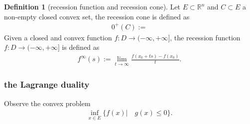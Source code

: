 \documentclass[a4paper,11pt,fleqn, draft]{book}
\newtheorem{lemma}[theorem]{Lemma}
\theoremstyle{definition}
\newtheorem{definition}{Definition}[section]
\theoremstyle{remark}
\newtheorem*{remark}{Remark}
\DeclareMathOperator*{\interior}{int}
\begin{document}
\begin{definition}[recession function and recession cone]
Let $E \subset \mathbb{R}^n$ and $C \subset E$ a non-empty closed convex set, the recession cone is defined as
	\begin{align*}
		0^+(C):= 
	\end{align*}
	Given a closed and convex function $f: D \rightarrow (-\infty, +\infty]$, the recession function $f: D \rightarrow ( -\infty, +\infty]$ is defined as 
	\begin{align*}
		f^\infty(s):= \lim_{t \rightarrow \infty} \frac{f(x_0 + ts) - f(x_0)}{t}.
	\end{align*}
\end{definition}

\subsubsection{the Lagrange duality}
Observe the convex problem
\begin{align*}
	\inf_{x \in E} \{ f(x) | \quad g(x) \le 0 \}.
\end{align*}


\end{document}
